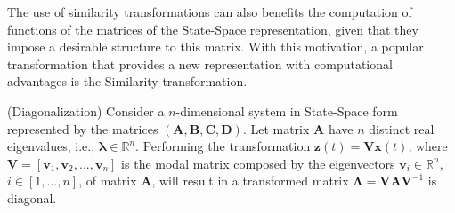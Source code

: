 \documentclass[a4paper,11pt]{book}
\numberwithin{figure}{chapter}
\numberwithin{equation}{chapter}
\numberwithin{table}{chapter}
\newtheorem{theorem}{Theorem}[chapter]
\theoremstyle{definition}
\newcounter{boxed-theorem}
\newenvironment{boxed-theorem}[1]
{\colorlet{shadecolor}{pastelBlue2!5} \begin{shaded} \begin{theorem}{#1}}
{\end{theorem} \end{shaded}}
\newcounter{boxed-lemma}
\newcounter{boxed-definition}
\newcounter{boxed-example}
\begin{document}
The use of similarity transformations can also benefits the computation of functions of the matrices of the State-Space representation, given that they impose a desirable structure to this matrix. With this motivation, a popular transformation that provides a new representation with computational advantages is the Similarity transformation.

\begin{boxed-theorem}{(Diagonalization)}
    Consider a $n$-dimensional system in State-Space form represented by the matrices $(\bm{A}, \bm{B}, \bm{C}, \bm{D})$. Let matrix $\bm{A}$ have $n$ distinct real eigenvalues, i.e., $\bm{\lambda} \in \mathbb{R}^n$. Performing the transformation $\bm{z}(t) = \bm{V} \bm{x}(t)$, where $\bm{V} = [\bm{v}_1, \bm{v}_2, ..., \bm{v}_n]$ is the modal matrix composed by the eigenvectors $\bm{v}_i \in \mathbb{R}^n$, $i \in [1, ..., n]$, of matrix $\bm{A}$, will result in a transformed matrix $\bm{\Lambda} = \bm{V} \bm{A} \bm{V}^{-1}$ is diagonal.
\end{boxed-theorem} 
\end{document}
